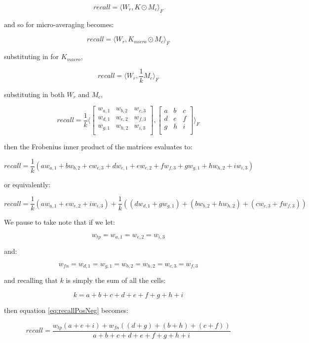 \documentclass[]{article}
\begin{document}
\[\textit{recall} = \langle W_r, K \odot M_c \rangle_F\]

\noindent and so for micro-averaging becomes:

\[\textit{recall} = \langle W_r, K_{micro} \odot M_c \rangle_F\]

\noindent substituting in for $K_{macro}$,

\[\textit{recall} = \langle W_r, \frac{1}{k}M_c \rangle_F\]

\noindent substituting in both $W_r$ and $M_c$,

\[\textit{recall} = \frac{1}{k}\langle \begin{bmatrix}
w_{a,1} & w_{b,2} & w_{c,3}\\
w_{d,1} & w_{e,2} & w_{f,3} \\
w_{g,1} & w_{h,2} & w_{i,3} \\
\end{bmatrix}, \begin{bmatrix}
a & b & c \\
d & e & f \\
g & h & i \\
\end{bmatrix} \rangle_F\]

\noindent then the Frobenius inner product of the matrices evaluates to:

\[\textit{recall} = \frac{1}{k}(aw_{a,1} + bw_{b,2} + cw_{c,3} + dw_{e,1} + ew_{e,2} + fw_{f,3} + gw_{g,1} + hw_{h,2} + iw_{i,3})\]

\noindent or equivalently:

\begin{equation} \label{eq:recallPosNeg}
\textit{recall} = \frac{1}{k}(aw_{a,1} + ew_{e,2} + iw_{i,3}) + \frac{1}{k}((dw_{d,1} + gw_{g,1}) + (bw_{b,2} + hw_{h,2}) + (cw_{c,3} +  fw_{f,3}))
\end{equation}

\noindent We pause to take note that if we let:

\[w_{tp} = w_{a,1} = w_{e,2} = w_{i,3}\]

\noindent and:

\[w_{fn} = w_{d,1} = w_{g,1} = w_{b,2} = w_{h,2} = w_{c,3} = w_{f,3}\]

\noindent and recalling that $k$ is simply the sum of all the cells:

\[k = a + b + c + d + e + f + g + h + i\]

\noindent then equation \ref{eq:recallPosNeg} becomes:

\begin{equation}
\textit{recall} = \frac{w_{tp}(a + e + i) + w_{fn}((d + g) + (b + h) + (c + f))}{a + b + c + d + e + f + g + h + i}
\end{equation}
\end{document}
